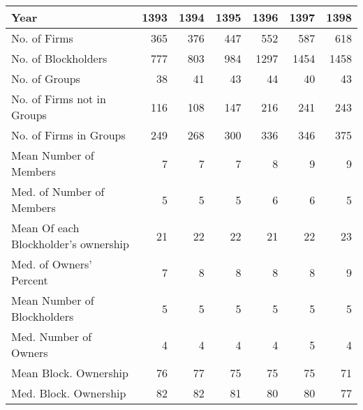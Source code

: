 \begin{tabular}{lrrrrrr}
\toprule
Year &  1393 &  1394 &  1395 &  1396 &  1397 &  1398 \\
\midrule
No. of Firms                         &   365 &   376 &   447 &   552 &   587 &   618 \\
No. of Blockholders                  &   777 &   803 &   984 &  1297 &  1454 &  1458 \\
No. of Groups                        &    38 &    41 &    43 &    44 &    40 &    43 \\
No. of Firms not in Groups           &   116 &   108 &   147 &   216 &   241 &   243 \\
No. of Firms in Groups               &   249 &   268 &   300 &   336 &   346 &   375 \\
Mean Number of Members               &     7 &     7 &     7 &     8 &     9 &     9 \\
Med. of  Number of Members           &     5 &     5 &     5 &     6 &     6 &     5 \\
Mean Of each Blockholder’s ownership &    21 &    22 &    22 &    21 &    22 &    23 \\
Med. of Owners' Percent              &     7 &     8 &     8 &     8 &     8 &     9 \\
Mean Number of Blockholders          &     5 &     5 &     5 &     5 &     5 &     5 \\
Med. Number of Owners                &     4 &     4 &     4 &     4 &     5 &     4 \\
Mean Block. Ownership                &    76 &    77 &    75 &    75 &    75 &    71 \\
Med. Block. Ownership                &    82 &    82 &    81 &    80 &    80 &    77 \\
\bottomrule
\end{tabular}
